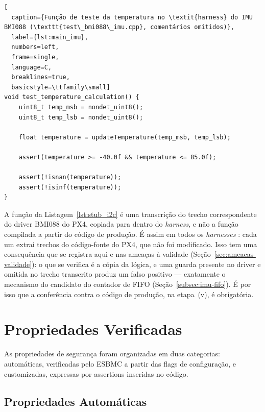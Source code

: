 \begin{lstlisting}[
  caption={Função de teste da temperatura no \textit{harness} do IMU BMI088 (\texttt{test\_bmi088\_imu.cpp}, comentários omitidos)},
  label={lst:main_imu},
  numbers=left,
  frame=single,
  language=C,
  breaklines=true,
  basicstyle=\ttfamily\small]
void test_temperature_calculation() {
    uint8_t temp_msb = nondet_uint8();
    uint8_t temp_lsb = nondet_uint8();

    float temperature = updateTemperature(temp_msb, temp_lsb);

    assert(temperature >= -40.0f && temperature <= 85.0f);

    assert(!isnan(temperature));
    assert(!isinf(temperature));
}
\end{lstlisting}

A função da Listagem~\ref{lst:stub_i2c} é uma transcrição do trecho
correspondente do driver BMI088 do PX4, copiada para dentro do
\textit{harness}, e não a função compilada a partir do código de produção. É assim
em todos os \textit{harnesses} : cada um extrai trechos do código-fonte do PX4,
que não foi modificado. Isso tem uma consequência que se registra aqui e nas
ameaças à validade (Seção~\ref{sec:ameacas-validade}): o que se verifica é a
cópia da lógica, e uma guarda presente no driver e omitida no trecho transcrito
produz um falso positivo --- exatamente o mecanismo do candidato do contador de
FIFO (Seção~\ref{subsec:imu-fifo}). É por isso que a conferência contra o código
de produção, na etapa~(v), é obrigatória. 

\section{Propriedades Verificadas}
\label{sec:propriedades}

As propriedades de segurança foram organizadas em duas categorias: automáticas,
verificadas pelo ESBMC a partir das flags de configuração, e customizadas,
expressas por assertions inseridas no código.

\subsection{Propriedades Automáticas}

